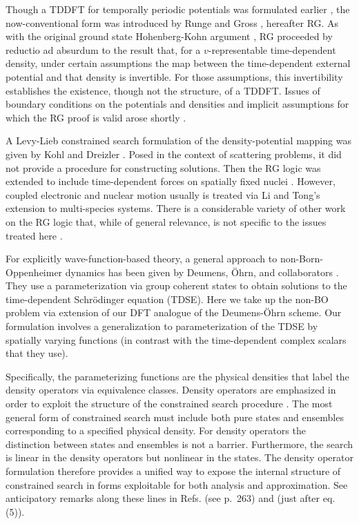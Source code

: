 Though a TDDFT for temporally periodic potentials was formulated earlier %
\cite{Bartolotti81,DebGhosh82}, the now-conventional form was introduced by
Runge and Gross \cite{RG84}, hereafter RG. As with the original ground state
Hohenberg-Kohn argument \cite{HK}, RG proceeded by reductio ad absurdum to
the result that, for a $v$-representable time-dependent density, under
certain assumptions the map between the time-dependent external potential
and that density is invertible. For those assumptions, this invertibility
establishes the existence, though not the structure, of a TDDFT. Issues of
boundary conditions on the potentials and densities and implicit assumptions
for which the RG proof is valid arose shortly \cite{Xu85,Dhara87}.

A Levy-Lieb constrained search \cite{Levy79,LevyPerdew85,Lieb} formulation
of the density-potential mapping was given by Kohl and Dreizler \cite{KD86}.
Posed in the context of scattering problems, it did not provide a procedure
for constructing solutions. Then the RG logic was extended to include
time-dependent forces on spatially fixed nuclei \cite{KD86,Raj94A,RajBuot94B}%
. However, coupled electronic and nuclear motion usually is treated via Li
and Tong's extension \cite{LiTong86} to multi-species systems. There is a
considerable variety of other work on the RG logic that, while of general
relevance, is not specific to the issues treated here \cite%
{Qian98,Chermyak00}.

For explicitly wave-function-based theory, a general approach to
non-Born-Oppenheimer dynamics has been given by Deumens, \"Ohrn, and
collaborators \cite{DeumensA,DeumensB}. They use a parameterization via
group coherent states to obtain solutions to the time-dependent
Schr\"odinger equation (TDSE). Here we take up the non-BO problem via
extension of our DFT analogue \cite{BLWSBT99a,BLWSBT00a} of the
Deumens-\"Ohrn scheme. Our formulation involves a generalization to
parameterization of the TDSE by spatially varying functions (in contrast
with the time-dependent complex scalars that they use).

Specifically, the parameterizing functions are the physical densities that
label the density operators via equivalence classes. Density operators are
emphasized in order to exploit the structure of the constrained search
procedure \cite{Levy79,LevyPerdew85}. The most general form of constrained
search must include both pure states and ensembles corresponding to a
specified physical density. For density operators the distinction between
states and ensembles is not a barrier. Furthermore, the search is linear in
the density operators but nonlinear in the states. The density operator
formulation therefore provides a unified way to expose the internal
structure of constrained search in forms exploitable for both analysis and
approximation. See anticipatory remarks along these lines in Refs. %
 (see p.~263) and  (just after eq. (5)).

